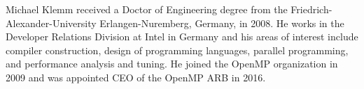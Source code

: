 \begin{IEEEbiography}{Michael Klemm}
received a Doctor of Engineering degree
from the Friedrich-Alexander-University
Erlangen-Nuremberg, Germany, in 2008. He works in
the Developer Relations Division at Intel in
Germany and his areas of interest include compiler
construction, design of programming languages,
parallel programming, and performance analysis
and tuning. He joined the OpenMP
organization in 2009 and was appointed CEO of the
OpenMP ARB in 2016.
\end{IEEEbiography}
